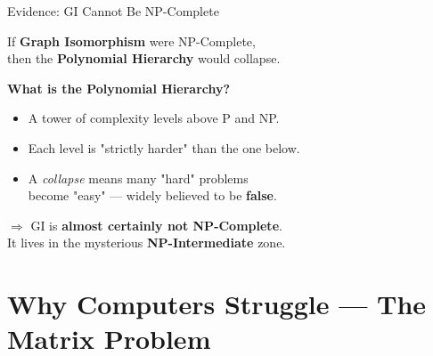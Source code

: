 \documentclass[10pt, aspectratio=169]{beamer}
\newcommand{\faFlask}{$\triangleright$}
\begin{document}
\begin{frame}{Evidence: GI Cannot Be NP-Complete}
	\begin{tcolorbox}[defbox, title={\faFlask\; Schöning's Theorem (1988) \cite{Schoening1988}}]
		If \textbf{Graph Isomorphism} were NP-Complete,\\
		then the \textbf{Polynomial Hierarchy} would \alert{collapse}.
	\end{tcolorbox}

	\vspace{0.5em}
	\textbf{What is the Polynomial Hierarchy?}
	\begin{itemize}
		\item A tower of complexity levels above P and NP.
		\item Each level is "strictly harder" than the one below.
		\item A \textit{collapse} means many "hard" problems\\become "easy" — widely believed to be \textbf{false}.
	\end{itemize}


	\vspace{0.4em}
	\begin{tcolorbox}[greenbox]
		\centering
		$\Rightarrow$ GI is \textbf{almost certainly not NP-Complete}.\\
		It lives in the mysterious \textbf{NP-Intermediate} zone.
	\end{tcolorbox}
\end{frame}

\section{Why Computers Struggle — The Matrix Problem}
\end{document}
